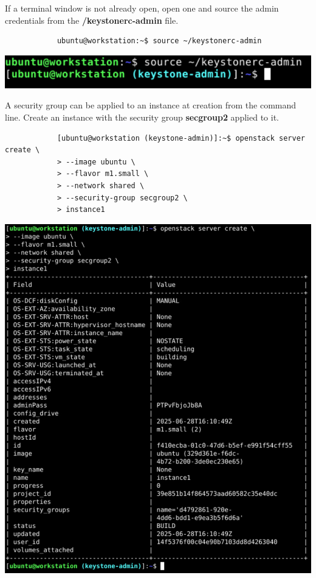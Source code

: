 \documentclass[letterpaper, 12pt]{article}
\begin{document}
\begin{enumerate}
    \begin{labstep}
        If a terminal window is not already open, open one and source the admin credentials from the \textbf{\texttildemid/keystonerc-admin} file.
        \begin{lstlisting}
            ubuntu@workstation:~$ source ~/keystonerc-admin
        \end{lstlisting}

        \begin{center}
            \includegraphics[width=\linewidth]{images/part6/step1.png}
        \end{center}
    \end{labstep}

    \begin{labstep}
        A security group can be applied to an instance at creation from the command line.
        Create an instance with the security group \textbf{secgroup2} applied to it.
        \begin{lstlisting}
            [ubuntu@workstation (keystone-admin)]:~$ openstack server create \
            > --image ubuntu \
            > --flavor m1.small \
            > --network shared \
            > --security-group secgroup2 \
            > instance1
        \end{lstlisting}

        \begin{center}
            \includegraphics[width=\linewidth]{images/part6/step2.png}
        \end{center}
    \end{labstep}


\end{enumerate}
\end{document}
